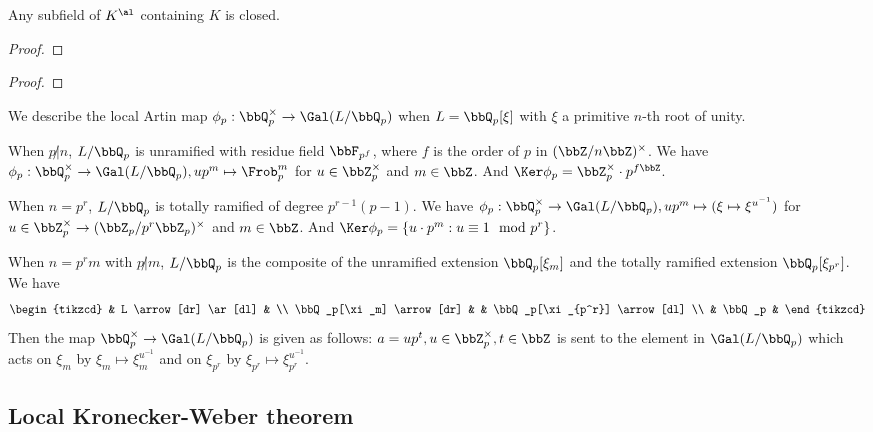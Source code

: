   \begin{lemma}
    Any subfield of $K^\al$ containing $K$ is closed.
  \end{lemma}
  \begin{proof}
    \Yang{}
  \end{proof}

  \begin{proof}
    
  \end{proof}

  \begin{example}
    We describe the local Artin map $\phi_p: \bbQ_p^\times \to \Gal(L/\bbQ_p)$ when $L = \bbQ_p[\xi]$ with $\xi$ a primitive $n$-th root of unity.
    
    When $p \not| n$, $L/\bbQ_p$ is unramified with residue field $\bbF_{p^f}$, where $f$ is the order of $p$ in $(\bbZ/n\bbZ)^\times$.
    We have $\phi_p: \bbQ_p^\times \to \Gal(L/\bbQ_p), u p^m \mapsto \Frob_p^m$ for $u \in \bbZ_p^\times$ and $m \in \bbZ$.
    And $\Ker \phi_p = \bbZ_p^\times \cdot p^{f\bbZ}$.

    When $n = p^r$, $L/\bbQ_p$ is totally ramified of degree $p^{r-1}(p-1)$.
    We have $\phi_p: \bbQ_p^\times \to \Gal(L/\bbQ_p), u p^m \mapsto (\xi \mapsto \xi^{u^{-1}})$ for $u \in \bbZ_p^\times \to (\bbZ_p/p^r\bbZ_p)^\times$ and $m \in \bbZ$.
    And $\Ker \phi_p = \{ u \cdot p^m : u \equiv 1 \mod p^r \}$.

    When $n = p^r m$ with $p \not| m$, $L/\bbQ_p$ is the composite of the unramified extension $\bbQ_p[\xi_m]$ and the totally ramified extension $\bbQ_p[\xi_{p^r}]$.
    We have 
    \[\begin{tikzcd}
       & L \arrow[dr] \ar[dl] & \\
      \bbQ_p[\xi_m] \arrow[dr] & & \bbQ_p[\xi_{p^r}] \arrow[dl] \\
       & \bbQ_p &
    \end{tikzcd}\]
    Then the map $\bbQ_p^\times \to \Gal(L/\bbQ_p)$ is given as follows:
    $a = u p^t, u \in \bbZ_p^\times, t \in \bbZ$ is sent to the element in $\Gal(L/\bbQ_p)$ which acts on $\xi_m$ by $\xi_m \mapsto \xi_m^{u^{-1}}$ and on $\xi_{p^r}$ by $\xi_{p^r} \mapsto \xi_{p^r}^{u^{-1}}$.
  \end{example}


\subsection{Local Kronecker-Weber theorem}

